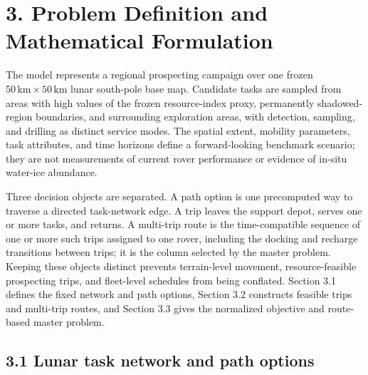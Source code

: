 \documentclass[
  11pt,
]{article}
\begin{document}
\hypertarget{problem-definition-and-mathematical-formulation}{%
\section{3. Problem Definition and Mathematical
Formulation}\label{problem-definition-and-mathematical-formulation}}

The model represents a regional prospecting campaign over one frozen
\(50\,\mathrm{km}\times50\,\mathrm{km}\) lunar south-pole base map.
Candidate tasks are sampled from areas with high values of the frozen
resource-index proxy, permanently shadowed-region boundaries, and
surrounding exploration areas, with detection, sampling, and drilling as
distinct service modes. The spatial extent, mobility parameters, task
attributes, and time horizons define a forward-looking benchmark
scenario; they are not measurements of current rover performance or
evidence of in-situ water-ice abundance.

Three decision objects are separated. A path option is one precomputed
way to traverse a directed task-network edge. A trip leaves the support
depot, serves one or more tasks, and returns. A multi-trip route is the
time-compatible sequence of one or more such trips assigned to one
rover, including the docking and recharge transitions between trips; it
is the column selected by the master problem. Keeping these objects
distinct prevents terrain-level movement, resource-feasible prospecting
trips, and fleet-level schedules from being conflated. Section 3.1
defines the fixed network and path options, Section 3.2 constructs
feasible trips and multi-trip routes, and Section 3.3 gives the
normalized objective and route-based master problem.

\hypertarget{lunar-task-network-and-path-options}{%
\subsection{3.1 Lunar task network and path
options}\label{lunar-task-network-and-path-options}}
\end{document}
